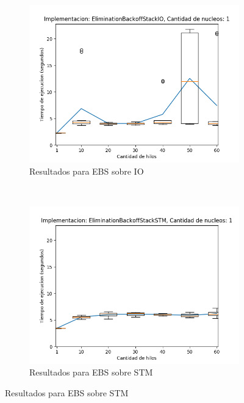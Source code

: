 \begin{appendices}
\begin{figure}[H]
    \centering
    \begin{subfigure}[b]{0.49\textwidth}
        \includegraphics[width=\textwidth]{images/numberOfThreadsDist/plots/expEBSIO-1}
        \caption{Resultados para EBS sobre IO}
        \label{subfig:numberOfThreadsDist-ebsio-1}
    \end{subfigure}
    ~
    \begin{subfigure}[b]{0.49\textwidth}
        \includegraphics[width=\textwidth]{images/numberOfThreadsDist/plots/expEBSSTM-1}
        \caption{Resultados para EBS sobre STM}
        \label{subfig:numberOfThreadsDist-ebsstm-1}
    \end{subfigure}

\end{figure}
\end{appendices}
